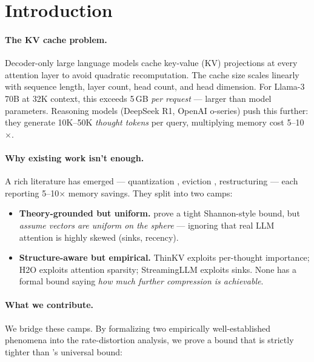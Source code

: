 \documentclass[11pt]{article}
\theoremstyle{definition}
\begin{document}
\section{Introduction}
\label{sec:intro}

\paragraph{The KV cache problem.}
Decoder-only large language models cache key-value (KV) projections at every attention layer to avoid quadratic recomputation. The cache size scales linearly with sequence length, layer count, head count, and head dimension. For Llama-3 70B at 32K context, this exceeds 5\,GB \emph{per request} --- larger than model parameters. Reasoning models (DeepSeek R1, OpenAI o-series) push this further: they generate 10K--50K \emph{thought tokens} per query, multiplying memory cost 5--10$\times$.

\paragraph{Why existing work isn't enough.}
A rich literature has emerged --- quantization \citep{turboquant, kivi, kvtc}, eviction \citep{h2o, streamingllm, trim-kv}, restructuring \citep{kv-direct} --- each reporting 5--10$\times$ memory savings. They split into two camps:
\begin{itemize}
\item \textbf{Theory-grounded but uniform.} \citet{turboquant} prove a tight Shannon-style bound, but \emph{assume vectors are uniform on the sphere} --- ignoring that real LLM attention is highly skewed (sinks, recency).
\item \textbf{Structure-aware but empirical.} ThinKV exploits per-thought importance; H2O exploits attention sparsity; StreamingLLM exploits sinks. None has a formal bound saying \emph{how much further compression is achievable}.
\end{itemize}

\paragraph{What we contribute.}
We bridge these camps. By formalizing two empirically well-established phenomena into the rate-distortion analysis, we prove a bound that is strictly tighter than \citet{turboquant}'s universal bound:
\end{document}
